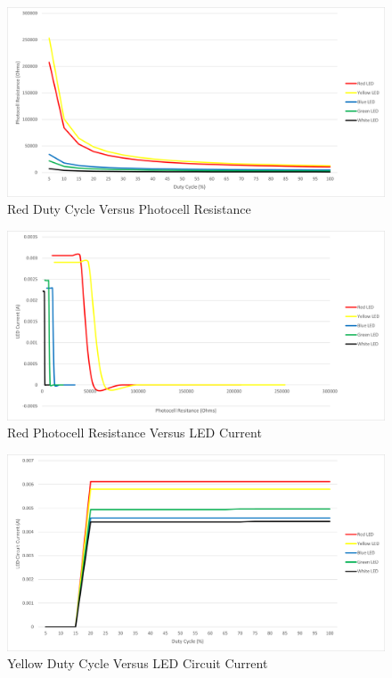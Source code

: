 \documentclass[12pt,titlepage]{article}
\begin{document}
\begin{figure}[!htb]
\centering
\includegraphics[width=5in]{lab_4/duty_cycle_photo_res.png}
\caption{Red Duty Cycle Versus Photocell Resistance}
\end{figure}
\begin{figure}[!htb]
  \centering
  \includegraphics[width=5in]{lab_4/photo_res_led_curr.png}
  \caption{Red Photocell Resistance Versus LED Current}
\end{figure}
\begin{figure}[!htb]
  \centering
  \includegraphics[width=5in]{lab_4/duty_cycle_led_circuit_curr.png}
  \caption{Yellow Duty Cycle Versus LED Circuit Current}
\end{figure}
\end{document}
